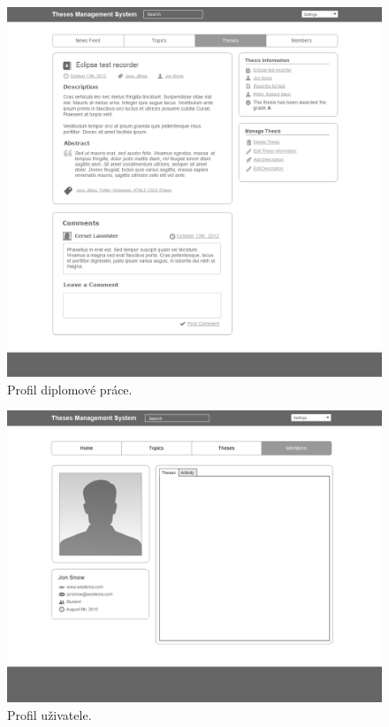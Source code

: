 \begin{figure}[htbp]
    \centering
    \includegraphics[width=\textwidth]{images/w1.png}
    \caption{Profil diplomové práce.}
    \label{img:layout1}
\end{figure}

\begin{figure}[htbp]
    \centering
    \includegraphics[width=\textwidth]{images/w3.png}
    \caption{Profil uživatele.}
    \label{img:layout1}
\end{figure}

